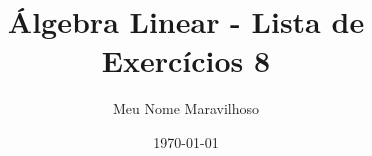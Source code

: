 \documentclass[leqno]{article}
\numberwithin{equation}{section}
\begin{document}
\newtheorem{teo}{Teorema}[section] \newtheorem*{teo*}{Teorema}
\newtheorem{prop}[teo]{Proposição} \newtheorem*{prop*}{Proposição}
\newtheorem{lema}[teo]{Lemma} \newtheorem*{lema*}{Lema}
\newtheorem{cor}[teo]{Corolário} \newtheorem*{cor*}{Corolário}

\theoremstyle{definition}
\newtheorem{defi}[teo]{Definição} \newtheorem*{defi*}{Definição}
\newtheorem{exem}[teo]{Exemplo} \newtheorem*{exem*}{Exemplo}
\newtheorem{obs}[teo]{Observação} \newtheorem*{obs*}{Observação}
\newtheorem*{hipo}{Hipóteses}
\newtheorem*{nota}{Notação}

\newcommand{\ds}{\displaystyle} \newcommand{\nl}{\newline}
\newcommand{\eps}{\varepsilon} \newcommand{\ssty}{\scriptstyle}
\newcommand{\bE}{\mathbb{E}}
\newcommand{\cB}{\mathcal{B}}
\newcommand{\cF}{\mathcal{F}}
\newcommand{\cA}{\mathcal{A}}
\newcommand{\cM}{\mathcal{M}}
\newcommand{\cD}{\mathcal{D}}
\newcommand{\cN}{\mathcal{N}}
\newcommand{\cL}{\mathcal{L}}
\newcommand{\cLN}{\mathcal{LN}}
\newcommand{\bP}{\mathbb{P}}
\newcommand{\bQ}{\mathbb{Q}}
\newcommand{\bN}{\mathbb{N}}
\newcommand{\bR}{\mathbb{R}}
\newcommand{\bZ}{\mathbb{Z}}

\newcommand{\bfw}{\mathbf{w}}
\newcommand{\bfv}{\mathbf{v}}
\newcommand{\bfu}{\mathbf{u}}
\newcommand{\bfx}{\mathbf{x}}
\newcommand{\bfb}{\mathbf{b}}

\newcommand{\bvecc}[2]{%
  \begin{bmatrix} #1 \\ #2  \end{bmatrix}
}
\newcommand{\bveccc}[3]{%
  \begin{bmatrix} #1 \\ #2 \\ #3  \end{bmatrix}
}

\newenvironment{sol} 
{
    \vspace{4mm}
    \noindent\textbf{Resolução:}
    \strut\newline
    \smallskip
    \hspace{-3.5mm} 
} 
{\noindent\rule{4cm}{.1mm}}


\title{Álgebra Linear - Lista de Exercícios 8}

\author{Meu Nome Maravilhoso}

\date{\today}

\maketitle
\end{document}
